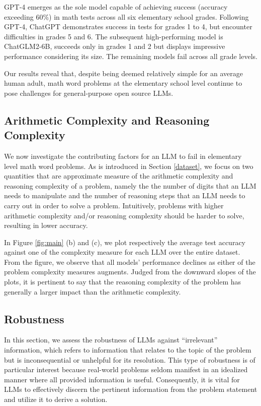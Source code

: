 GPT-4 emerges as the sole model capable of achieving success (accuracy exceeding 60\%) in math tests across all six elementary school grades. Following GPT-4, ChatGPT demonstrates success in tests for grades 1 to 4, but encounter difficulties in grades 5 and 6. The subsequent high-performing model is ChatGLM2-6B, succeeds only in grades 1 and 2 but displays impressive performance considering its size. The remaining models fail across all grade levels. 

Our results reveal that, despite being deemed relatively simple for an average human adult, math word problems at the elementary school level continue to pose challenges for general-purpose open source LLMs.

\subsection{Arithmetic Complexity and Reasoning Complexity} We now investigate the contributing factors for an LLM to fail in elementary level math word problems. As is introduced in Section \ref{dataset},
we focus on two quantities that are approximate measure of the arithmetic complexity and reasoning complexity of a problem, namely the the number of digits that an LLM needs to manipulate and the number of reasoning steps that an LLM needs to carry out in order to solve a problem. Intuitively, problems with higher arithmetic complexity and/or reasoning complexity should be harder to solve, resulting in lower accuracy.

In Figure \ref{fig:main} (b) and (c), we plot respectively the average test accuracy against one of the complexity measure for each LLM over the entire dataset. From the figure, we observe that all models' performance declines as either of the problem complexity measures augments.  Judged from the downward slopes of the plots, it is pertinent to say that the reasoning complexity of the problem has generally a larger impact than the arithmetic complexity.  

\subsection{Robustness}
In this section, we assess the robustness of LLMs against ``irrelevant'' information, which refers to information that relates to the topic of the problem but is inconsequential or unhelpful for its resolution. This type of robustness is of particular interest because real-world problems seldom manifest in an idealized manner where all provided information is useful. Consequently, it is vital for LLMs to effectively discern the pertinent information from the problem statement and utilize it to derive a solution.

